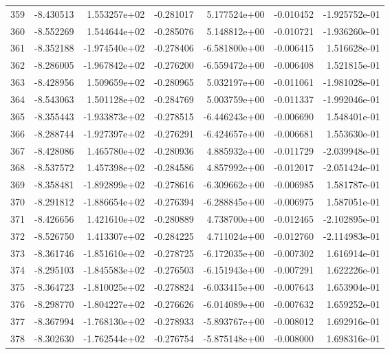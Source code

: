 \begin{tabular}{rrrrrrr}
 359 &  -8.430513 &  1.553257e+02 & -0.281017 &  5.177524e+00 &   -0.010452 & -1.925752e-01 \\
 360 &  -8.552269 &  1.544644e+02 & -0.285076 &  5.148812e+00 &   -0.010721 & -1.936260e-01 \\
 361 &  -8.352188 & -1.974540e+02 & -0.278406 & -6.581800e+00 &   -0.006415 &  1.516628e-01 \\
 362 &  -8.286005 & -1.967842e+02 & -0.276200 & -6.559472e+00 &   -0.006408 &  1.521815e-01 \\
 363 &  -8.428956 &  1.509659e+02 & -0.280965 &  5.032197e+00 &   -0.011061 & -1.981028e-01 \\
 364 &  -8.543063 &  1.501128e+02 & -0.284769 &  5.003759e+00 &   -0.011337 & -1.992046e-01 \\
 365 &  -8.355443 & -1.933873e+02 & -0.278515 & -6.446243e+00 &   -0.006690 &  1.548401e-01 \\
 366 &  -8.288744 & -1.927397e+02 & -0.276291 & -6.424657e+00 &   -0.006681 &  1.553630e-01 \\
 367 &  -8.428086 &  1.465780e+02 & -0.280936 &  4.885932e+00 &   -0.011729 & -2.039948e-01 \\
 368 &  -8.537572 &  1.457398e+02 & -0.284586 &  4.857992e+00 &   -0.012017 & -2.051424e-01 \\
 369 &  -8.358481 & -1.892899e+02 & -0.278616 & -6.309662e+00 &   -0.006985 &  1.581787e-01 \\
 370 &  -8.291812 & -1.886654e+02 & -0.276394 & -6.288845e+00 &   -0.006975 &  1.587051e-01 \\
 371 &  -8.426656 &  1.421610e+02 & -0.280889 &  4.738700e+00 &   -0.012465 & -2.102895e-01 \\
 372 &  -8.526750 &  1.413307e+02 & -0.284225 &  4.711024e+00 &   -0.012760 & -2.114983e-01 \\
 373 &  -8.361746 & -1.851610e+02 & -0.278725 & -6.172035e+00 &   -0.007302 &  1.616914e-01 \\
 374 &  -8.295103 & -1.845583e+02 & -0.276503 & -6.151943e+00 &   -0.007291 &  1.622226e-01 \\
 375 &  -8.364723 & -1.810025e+02 & -0.278824 & -6.033415e+00 &   -0.007643 &  1.653904e-01 \\
 376 &  -8.298770 & -1.804227e+02 & -0.276626 & -6.014089e+00 &   -0.007632 &  1.659252e-01 \\
 377 &  -8.367994 & -1.768130e+02 & -0.278933 & -5.893767e+00 &   -0.008012 &  1.692916e-01 \\
 378 &  -8.302630 & -1.762544e+02 & -0.276754 & -5.875148e+00 &   -0.008000 &  1.698316e-01 \\

\end{tabular}
